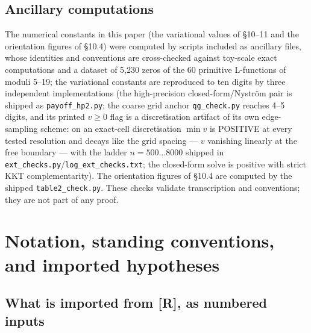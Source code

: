 \documentclass[11pt]{amsart}
\theoremstyle{plain}
\theoremstyle{remark}
\begin{document}
\subsection{Ancillary computations}

The numerical constants in this paper (the variational values of \S10--11 and the
orientation figures of \S10.4) were computed by scripts included as ancillary files,
whose identities and conventions are cross-checked against toy-scale exact
computations and a dataset of 5,230 zeros of the 60 primitive L-functions of moduli
5--19; the variational constants are reproduced to ten digits by three independent
implementations (the high-precision closed-form/Nystr\"om pair is shipped as
\texttt{payoff\_hp2.py}; the coarse grid anchor \texttt{qg\_check.py} reaches 4--5
digits, and its printed $v \ge 0$ flag is a discretisation artifact of its own
edge-sampling scheme: on an exact-cell discretisation $\min v$ is POSITIVE at every
tested resolution and decays like the grid spacing --- $v$ vanishing linearly at the
free boundary --- with the ladder $n = 500\dots8000$ shipped in
\texttt{ext\_checks.py}/\texttt{log\_ext\_checks.txt}; the closed-form solve is
positive with strict KKT complementarity). The orientation figures of \S10.4 are
computed by the shipped \texttt{table2\_check.py}. These checks validate transcription
and conventions; they are not part of any proof.

\section{Notation, standing conventions, and imported hypotheses}

\subsection{What is imported from [R], as numbered inputs}
\end{document}

